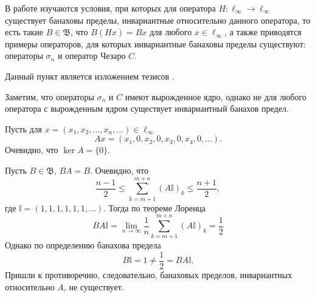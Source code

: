 В работе \cite{Semenov2010invariant} изучаются условия,
при которых для оператора $H:\ell_\infty\to \ell_\infty$ существует банаховы пределы,
инвариантные относительно данного оператора, то есть такие $B\in\mathfrak{B}$,
что $B(Hx) = Bx$ для любого $x\in\ell_\infty$,
а также приводятся примеры операторов, для которых инвариантные банаховы пределы существуют:
операторы $\sigma_n$ и оператор Чезаро $C$.

Данный пункт является изложением тезисов \cite{our-vvmsh-2018}.

Заметим, что операторы $\sigma_n$ и $C$ имеют вырожденное ядро,
однако не для любого оператора с вырожденным ядром существует инвариантный банахов предел.

\begin{example}
	Пусть для $x = (x_1, x_2, ..., x_n, ...)\in \ell_\infty$
	\begin{equation*}
		Ax = (x_1, 0, x_2, 0, x_3, 0, x_4, 0, ...).
	\end{equation*}
	Очевидно, что $\ker A = \{0\}$.
\end{example}

Пусть $B\in\mathfrak{B}$, $BA = B$.
Очевидно, что
\begin{equation*}
	\frac{n-1}{2}\leqslant \sum_{k=m+1}^{m+n} (A\mathbb{I})_k \leqslant \frac{n+1}{2},
\end{equation*}
где $\mathbb{I} = (1, 1, 1, 1, 1, 1, ...)$.
Тогда по теореме Лоренца
\begin{equation*}
	BA\mathbb{I} =
	\lim_{n\to\infty} \frac{1}{n}\sum_{k=m+1}^{m+n} (A\mathbb{I})_k = \frac{1}{2}
\end{equation*}
Однако по определению банахова предела
\begin{equation*}
	B\mathbb{I} = 1 \neq \frac{1}{2} = BA\mathbb{I}.
\end{equation*}
Пришли к противоречию, следовательно, банаховых пределов, инвариантных относительно $A$, не существует.
